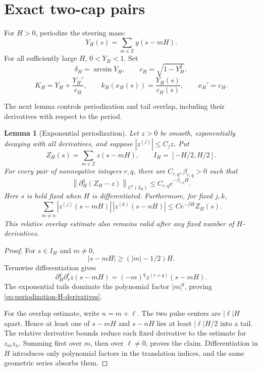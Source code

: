 \documentclass[11pt]{article}
\newtheorem{lemma}[theorem]{Lemma}
\theoremstyle{remark}
\begin{document}
\section{Exact two-cap pairs}\label{sec:pairs}

For $H>0$, periodize the steering mass:
\begin{equation}\label{eq:YH}
  Y_H(s)=\sum_{m\in\mathbb Z}y(s-mH).
\end{equation}
For all sufficiently large \(H\), \(0<Y_H<1\).  Set
\begin{equation}\label{eq:cap-definitions}
  \delta_H=\arcsin Y_H,
  \qquad
  c_H=\sqrt{1-Y_H^2},
\end{equation}
\begin{equation}\label{eq:cap-curvatures}
  K_H=Y_H+\frac{Y_H'}{c_H},
  \qquad
  k_H(x_H(s))=\frac{Y_H(s)}{c_H(s)},
  \qquad
  x_H'=c_H.
\end{equation}

The next lemma controls periodization and tail overlap, including their
derivatives with respect to the period.

\begin{lemma}[Exponential periodization]\label{lem:periodization}
Let \(z>0\) be smooth, exponentially decaying with all derivatives, and
suppose \(|z^{(j)}|\leq C_jz\).  Put
\[
   Z_H(s)=\sum_{m\in\mathbb Z}z(s-mH),
   \qquad I_H=[-H/2,H/2].
\]
For every pair of nonnegative integers \(r,q\), there are
\(C_{r,q},\beta_{r,q}>0\) such that
\begin{equation}\label{eq:periodization-H-derivatives}
   \left\|\partial_H^q(Z_H-z)\right\|_{C^r(I_H)}
      \leq C_{r,q}e^{-\beta_{r,q}H}.
\end{equation}
Here \(s\) is held fixed when \(H\) is differentiated.  Furthermore, for
fixed \(j,k\),
\begin{equation}\label{eq:overlap-pointwise}
   \sum_{m\ne n}
   |z^{(j)}(s-mH)|\,|z^{(k)}(s-nH)|
   \leq Ce^{-\beta H}Z_H(s).
\end{equation}
This relative overlap estimate also remains valid after any fixed number of
\(H\)-derivatives.
\end{lemma}

\begin{proof}
For \(s\in I_H\) and \(m\ne0\),
\[
   |s-mH|\geq(|m|-1/2)H.
\]
Termwise differentiation gives
\[
   \partial_H^q\partial_s^r z(s-mH)
   =(-m)^q z^{(r+q)}(s-mH).
\]
The exponential tails dominate the polynomial factor \(|m|^q\), proving
\eqref{eq:periodization-H-derivatives}.

For the overlap estimate, write \(n=m+\ell\).  The two pulse centers are
\(|\ell|H\) apart.  Hence at least one of \(s-mH\) and \(s-nH\) lies at least
\(|\ell|H/2\) into a tail.  The relative derivative bounds reduce each fixed derivative to the estimate
for \(z_mz_n\).  Summing first over \(m\), then over
\(\ell\ne0\), proves the claim.  Differentiation in \(H\) introduces only
polynomial factors in the translation indices, and the same geometric series
absorbs them.
\end{proof}
\end{document}
